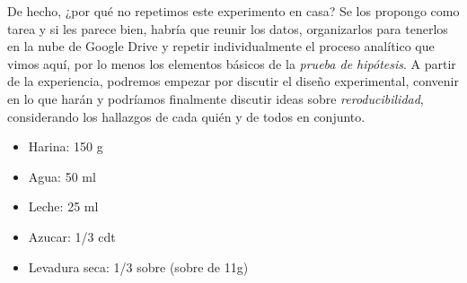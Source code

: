 \documentclass[
  letterpaper,
  DIV=11,
  numbers=noendperiod]{scrartcl}
\providecommand{\tightlist}{%
  \setlength{\itemsep}{0pt}\setlength{\parskip}{0pt}}\usepackage{longtable,booktabs,array}
\begin{document}
De hecho, ¿por qué no repetimos este experimento en casa? Se los
propongo como tarea y si les parece bien, habría que reunir los datos,
organizarlos para tenerlos en la nube de Google Drive y repetir
individualmente el proceso analítico que vimos aquí, por lo menos los
elementos básicos de la \emph{prueba de hipótesis}. A partir de la
experiencia, podremos empezar por discutir el diseño experimental,
convenir en lo que harán y podríamos finalmente discutir ideas sobre
\emph{reroducibilidad}, considerando los hallazgos de cada quién y de
todos en conjunto.

\begin{tcolorbox}[enhanced jigsaw, title=\textcolor{quarto-callout-tip-color}{\faLightbulb}\hspace{0.5em}{Pistas}, rightrule=.15mm, toptitle=1mm, toprule=.15mm, opacitybacktitle=0.6, bottomrule=.15mm, colbacktitle=quarto-callout-tip-color!10!white, colframe=quarto-callout-tip-color-frame, coltitle=black, opacityback=0, colback=white, breakable, bottomtitle=1mm, left=2mm, leftrule=.75mm, titlerule=0mm, arc=.35mm]

\begin{itemize}
\tightlist
\item
  Harina: 150 g
\item
  Agua: 50 ml
\item
  Leche: 25 ml
\item
  Azucar: 1/3 cdt
\item
  Levadura seca: 1/3 sobre (sobre de 11g)
\end{itemize}

\end{tcolorbox}
\end{document}
